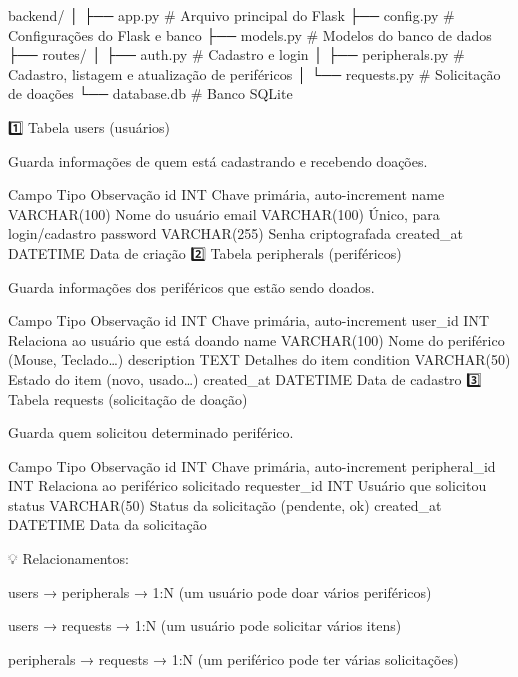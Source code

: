 backend/
│
├── app.py                # Arquivo principal do Flask
├── config.py             # Configurações do Flask e banco
├── models.py             # Modelos do banco de dados
├── routes/
│   ├── auth.py           # Cadastro e login
│   ├── peripherals.py    # Cadastro, listagem e atualização de periféricos
│   └── requests.py       # Solicitação de doações
└── database.db           # Banco SQLite


1️⃣ Tabela users (usuários)

Guarda informações de quem está cadastrando e recebendo doações.

Campo	Tipo	Observação
id	INT	Chave primária, auto-increment
name	VARCHAR(100)	Nome do usuário
email	VARCHAR(100)	Único, para login/cadastro
password	VARCHAR(255)	Senha criptografada
created_at	DATETIME	Data de criação
2️⃣ Tabela peripherals (periféricos)

Guarda informações dos periféricos que estão sendo doados.

Campo	Tipo	Observação
id	INT	Chave primária, auto-increment
user_id	INT	Relaciona ao usuário que está doando
name	VARCHAR(100)	Nome do periférico (Mouse, Teclado…)
description	TEXT	Detalhes do item
condition	VARCHAR(50)	Estado do item (novo, usado…)
created_at	DATETIME	Data de cadastro
3️⃣ Tabela requests (solicitação de doação)

Guarda quem solicitou determinado periférico.

Campo	Tipo	Observação
id	INT	Chave primária, auto-increment
peripheral_id	INT	Relaciona ao periférico solicitado
requester_id	INT	Usuário que solicitou
status	VARCHAR(50)	Status da solicitação (pendente, ok)
created_at	DATETIME	Data da solicitação

💡 Relacionamentos:

users → peripherals → 1:N (um usuário pode doar vários periféricos)

users → requests → 1:N (um usuário pode solicitar vários itens)

peripherals → requests → 1:N (um periférico pode ter várias solicitações)